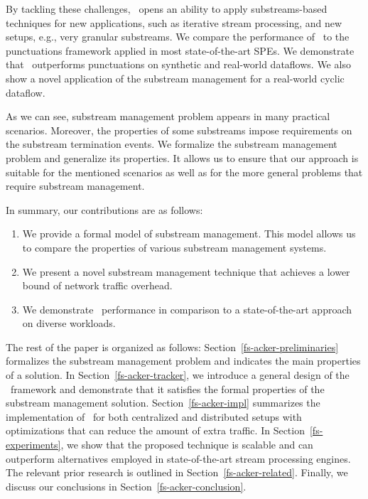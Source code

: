 By tackling these challenges, \tracker\ opens an ability to apply substreams-based techniques for new applications, such as iterative stream processing, and new setups, e.g., very granular substreams. We compare the performance of \tracker\ to the punctuations framework applied in most state-of-the-art SPEs. We demonstrate that \tracker\ outperforms punctuations on synthetic and real-world dataflows. We also show a novel application of the substream management for a real-world cyclic dataflow. 

As we can see, substream management problem appears in many practical scenarios. Moreover, the properties of some substreams impose requirements on the substream termination events. We formalize the substream management problem and generalize its properties. It allows us to ensure that our approach is suitable for the mentioned scenarios as well as for the more general problems that require substream management.

In summary, our contributions are as follows:
\begin{enumerate}
    \item We provide a formal model of substream management. This model allows us to compare the properties of various substream management systems.
    \item We present a novel substream management technique that achieves a lower bound of network traffic overhead.
    \item We demonstrate \tracker\ performance in comparison to a state-of-the-art approach on diverse workloads.
\end{enumerate}

The rest of the paper is organized as follows: Section~\ref{fs-acker-preliminaries} formalizes the substream management problem and indicates the main properties of a solution. In Section~\ref{fs-acker-tracker}, we introduce a general design of the \tracker\ framework and demonstrate that it satisfies the formal properties of the substream management solution. Section~\ref{fs-acker-impl} summarizes the implementation of \tracker\ for both centralized and distributed setups with optimizations that can reduce the amount of extra traffic. In Section~\ref{fs-experiments}, we show that the proposed technique is scalable and can outperform alternatives employed in state-of-the-art stream processing engines. The relevant prior research is outlined in Section~\ref{fs-acker-related}. Finally, we discuss our conclusions in Section~\ref{fs-acker-conclusion}.